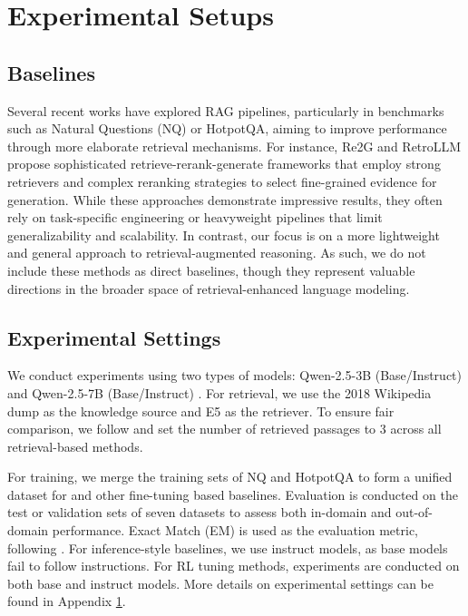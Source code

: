 \section{Experimental Setups}\label{sec:apx:setting}

\subsection{Baselines}

Several recent works have explored RAG pipelines, particularly in benchmarks such as Natural Questions (NQ) or HotpotQA, aiming to improve performance through more elaborate retrieval mechanisms. For instance, Re2G \citep{glass2022re2g} and RetroLLM \citep{li2024retrollm} propose sophisticated retrieve-rerank-generate frameworks that employ strong retrievers and complex reranking strategies to select fine-grained evidence for generation. While these approaches demonstrate impressive results, they often rely on task-specific engineering or heavyweight pipelines that limit generalizability and scalability. In contrast, our focus is on a more lightweight and general approach to retrieval-augmented reasoning. As such, we do not include these methods as direct baselines, though they represent valuable directions in the broader space of retrieval-enhanced language modeling.

\subsection{Experimental Settings}

We conduct experiments using two types of models: Qwen-2.5-3B (Base/Instruct) and Qwen-2.5-7B (Base/Instruct) \citep{yang2024qwen2}.
For retrieval, we use the 2018 Wikipedia dump \citep{karpukhin2020dense} as the knowledge source and E5 \citep{wang2022text} as the retriever. To ensure fair comparison, we follow \cite{lin2023ra} and set the number of retrieved passages to 3 across all retrieval-based methods. 

For training, we merge the training sets of NQ and HotpotQA to form a unified dataset for \Ours and other fine-tuning based baselines. Evaluation is conducted on the test or validation sets of seven datasets to assess both in-domain and out-of-domain performance. Exact Match (EM) is used as the evaluation metric, following \cite{yu2024rankrag}.
For inference-style baselines, we use instruct models, as base models fail to follow instructions. For RL tuning methods, experiments are conducted on both base and instruct models. More details on experimental settings can be found in Appendix \ref{sec:apx:setting}.

